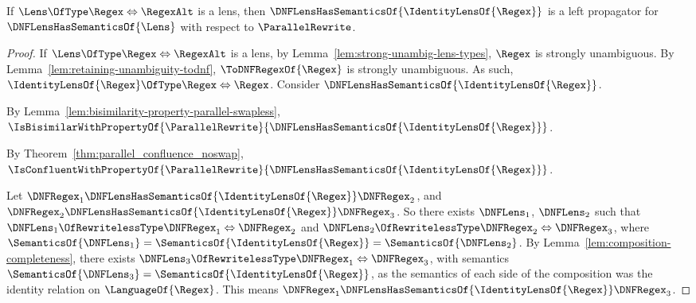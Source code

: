 \documentclass[acmsmall,screen]{acmart}
\begin{document}
\begin{mylemma}
  \label{lem:id-left-prop}
  If $\Lens \OfType \Regex \Leftrightarrow \RegexAlt$ is a lens,
  then $\DNFLensHasSemanticsOf{\IdentityLensOf{\Regex}}$ is a left propagator
  for $\DNFLensHasSemanticsOf{\Lens}$ with respect to $\ParallelRewrite$.
\end{mylemma}
\begin{proof}
  If $\Lens \OfType \Regex \Leftrightarrow \RegexAlt$ is a lens,
  by Lemma~\ref{lem:strong-unambig-lens-types},
  $\Regex$ is strongly unambiguous.
  By Lemma~\ref{lem:retaining-unambiguity-todnf}, $\ToDNFRegexOf{\Regex}$ is
  strongly unambiguous.
  As such, $\IdentityLensOf{\Regex} \OfType \Regex \Leftrightarrow \Regex$.
  Consider $\DNFLensHasSemanticsOf{\IdentityLensOf{\Regex}}$.
  
  By Lemma~\ref{lem:bisimilarity-property-parallel-swapless},
  $\IsBisimilarWithPropertyOf{\ParallelRewrite}{\DNFLensHasSemanticsOf{\IdentityLensOf{\Regex}}}$.
  
  By Theorem~\ref{thm:parallel_confluence_noswap},
  $\IsConfluentWithPropertyOf{\ParallelRewrite}{\DNFLensHasSemanticsOf{\IdentityLensOf{\Regex}}}$.
  
  Let $\DNFRegex_1 \DNFLensHasSemanticsOf{\IdentityLensOf{\Regex}} \DNFRegex_2$,
  and $\DNFRegex_2 \DNFLensHasSemanticsOf{\IdentityLensOf{\Regex}} \DNFRegex_3$.
  So there exists $\DNFLens_1$, $\DNFLens_2$ such that
  $\DNFLens_1 \OfRewritelessType \DNFRegex_1 \Leftrightarrow \DNFRegex_2$ and
  $\DNFLens_2 \OfRewritelessType \DNFRegex_2 \Leftrightarrow \DNFRegex_3$,
  where $\SemanticsOf{\DNFLens_1} = \SemanticsOf{\IdentityLensOf{\Regex}} =
  \SemanticsOf{\DNFLens_2}$.
  By Lemma~\ref{lem:composition-completeness}, there exists
  $\DNFLens_3 \OfRewritelessType \DNFRegex_1 \Leftrightarrow \DNFRegex_3$, with
  semantics $\SemanticsOf{\DNFLens_3} = \SemanticsOf{\IdentityLensOf{\Regex}}$,
  as the semantics of each side of the composition was the identity relation
  on $\LanguageOf{\Regex}$.  This means
  $\DNFRegex_1 \DNFLensHasSemanticsOf{\IdentityLensOf{\Regex}} \DNFRegex_3$.


\end{proof}
\end{document}
